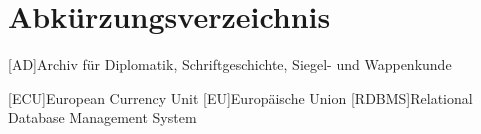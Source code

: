 \clearpage
\chapter*{Abkürzungsverzeichnis}	

\begin{acronym}[XXXXXXX]
	[AD]{Archiv für Diplomatik, Schriftgeschichte, Siegel- und Wappenkunde}

	[ECU]{European Currency Unit}
	[EU]{Europäische Union}
	[RDBMS]{Relational Database Management System}
\end{acronym}
